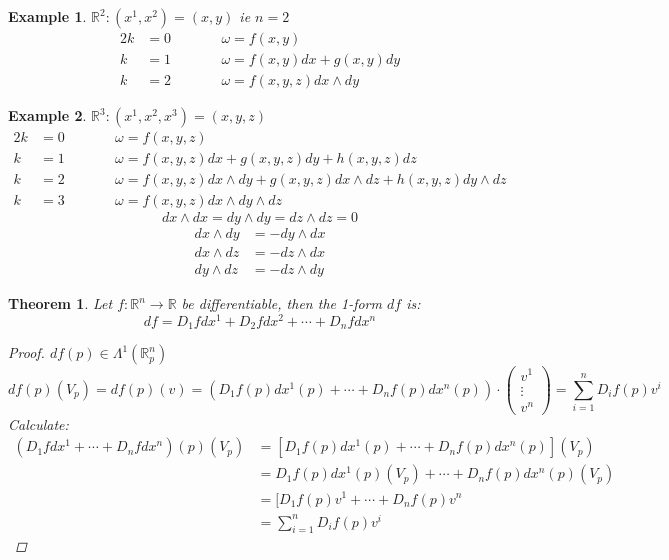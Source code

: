 \documentclass[12pt]{article}
\def\RR{\mathbb{R}}
\newtheorem{theorem}{Theorem}[section]
\newtheorem{example}{Example}[section]
\begin{document}
\begin{example} $\RR^2:(x^1, x^2 ) = (x,y)$ ie $n=2$
\begin{alignat*}{2}
k&=0 &\qquad &\omega = f(x,y)\\
k&=1 &\qquad &\omega = f(x,y)dx + g(x,y)dy\\
k&=2 &\qquad &\omega = f(x,y,z)dx\wedge dy
\end{alignat*}
\end{example}

\begin{example} $\RR^3:(x^1, x^2 , x^3) = (x,y,z)$
\begin{alignat*}{2}
k&=0 &\qquad &\omega = f(x,y,z)\\
k&=1 &\qquad &\omega = f(x,y,z)dx + g(x,y,z)dy + h(x,y,z)dz\\
k&=2 &\qquad &\omega = f(x,y,z)dx\wedge dy + g(x,y,z)dx\wedge dz + h(x,y,z)dy\wedge dz\\
k&=3 &\qquad &\omega = f(x,y,z)dx\wedge dy \wedge dz
\end{alignat*}
\[dx\wedge dx = dy\wedge dy =dz\wedge dz =0\]
\begin{align*}
dx\wedge dy &= -dy \wedge dx\\
dx\wedge dz &= -dz \wedge dx\\
dy\wedge dz &= -dz \wedge dy 
\end{align*}
\end{example}

\begin{theorem}
Let $f:\RR^n \rightarrow \RR$ be differentiable, then the 1-form $df$ is:
\[df = D_1fdx^1 + D_2fdx^2 + \cdots + D_nfdx^n \]
\begin{proof}
$df(p) \in \Lambda^1(\RR_p^n)$
\[df(p)(V_p) = df(p)(v) = (D_1f(p)dx^1(p)+ \cdots + D_nf(p)dx^n(p))\cdot \left(\! \!\begin{array}{c} v^1\\ \vdots \\ v^n \end{array} \! \! \right) = \sum\limits_{i=1}^{n}D_if(p)v^i \]
Calculate:
\begin{align*}
(D_1fdx^1 + \cdots + D_nfdx^n )(p)(V_p) &= [D_1f(p)dx^1(p)+ \cdots + D_nf(p)dx^n(p)] (V_p)\\
&=D_1f(p)dx^1(p)(V_p)+ \cdots + D_nf(p)dx^n(p)(V_p)\\
&=[D_1f(p)v^1+ \cdots + D_nf(p)v^n\\
&=\sum\limits_{i=1}^{n}D_if(p)v^i 
\end{align*}
\end{proof}
\end{theorem}
\end{document}
